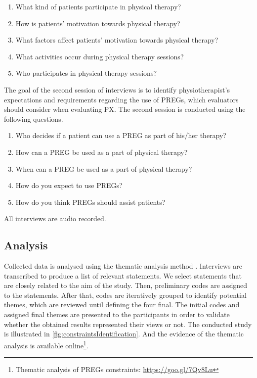 \begin{enumerate}
    \item What kind of patients participate in physical therapy?
    \item How is patients' motivation towards physical therapy?
    \item What factors affect patients' motivation towards physical therapy?
    \item What activities occur during physical therapy sessions?
    \item Who participates in physical therapy sessions?
\end{enumerate}

The goal of the second session of interviews is to identify physiotherapist's expectations and requirements regarding the use of \acp{PREG}, which evaluators should consider when evaluating \ac{PX}. The second session is conducted using the following questions.
\begin{enumerate}
    \item Who decides if a patient can use a \ac{PREG} as part of his/her therapy?
    \item How can a \ac{PREG} be used as a part of physical therapy?
    \item When can a \ac{PREG} be used as a part of physical therapy?
    \item How do you expect to use \acp{PREG}?
    \item How do you think \acp{PREG} should assist patients?
\end{enumerate}

All interviews are audio recorded.

\subsection{Analysis}

Collected data is analysed using the thematic analysis method \autocite{Burnard2008}. Interviews are transcribed to produce a list of relevant statements. We select statements that are closely related to the aim of the study. Then, preliminary codes are assigned to the statements. After that, codes are iteratively grouped to identify potential themes, which are reviewed until defining the four final. The initial codes and assigned final themes are presented to the participants in order to validate whether the obtained results represented their views or not. The conducted study is illustrated in \autoref{fig:constraintsIdentification}. And the evidence of the thematic analysis is available online\footnote{Thematic analysis of \acp{PREG} constraints: \url{https://goo.gl/7Qv8Lu}}.

